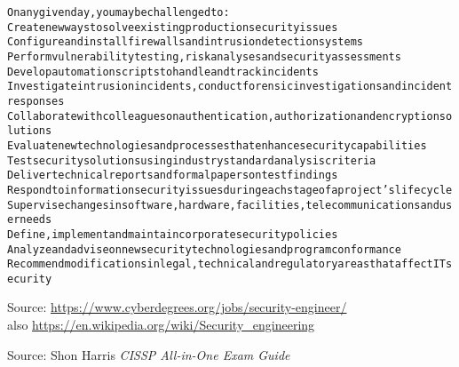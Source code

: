 \documentclass[Screen16to9,17pt]{foils}
\begin{document}
\begin{alltt}\footnotesize
On any given day, you may be challenged to:
        Create new ways to solve existing production security issues
        Configure and install firewalls and intrusion detection systems
        Perform vulnerability testing, risk analyses and security assessments
        Develop automation scripts to handle and track incidents
        Investigate intrusion incidents, conduct forensic investigations and incident responses
        Collaborate with colleagues on authentication, authorization and encryption solutions
        Evaluate new technologies and processes that enhance security capabilities
        Test security solutions using industry standard analysis criteria
        Deliver technical reports and formal papers on test findings
        Respond to information security issues during each stage of a project’s lifecycle
        Supervise changes in software, hardware, facilities, telecommunications and user needs
        Define, implement and maintain corporate security policies
        Analyze and advise on new security technologies and program conformance
        Recommend modifications in legal, technical and regulatory areas that affect IT security
\end{alltt}

Source: \url{https://www.cyberdegrees.org/jobs/security-engineer/}\\
also
\url{https://en.wikipedia.org/wiki/Security_engineering}






Source: Shon Harris \emph{CISSP All-in-One Exam Guide}



\end{document}
